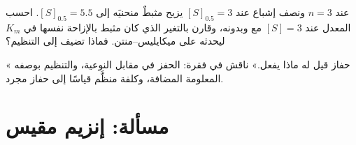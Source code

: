 \begin{exercise}[$\star\star\star$]\label{exo:b1:enzymes:11}
 عند $n = 3$ ونصف إشباع عند $[S]_{0.5}
= 3$ يزيح مثبطٌ
منحنيَه إلى $[S]_{0.5} = 5.5$. احسب المعدل عند $[S] = 3$ مع 
وبدونه، وقارن بالتغير الذي كان مثبط  بالإزاحة نفسها في $K_m$
ليحدثه على  ميكايليس--منتن. فماذا تضيف  إلى التنظيم؟
\end{exercise}

\begin{exercise}[$\star\star\star$]\label{exo:b1:enzymes:12}
« حفاز قيل له ماذا يفعل.» ناقش في فقرة: الحفز في مقابل
النوعية، والتنظيم بوصفه المعلومة المضافة، وكلفة  منظَّم قياسًا
إلى حفاز مجرد.
\end{exercise}

\section{مسألة: إنزيم مقيس}

